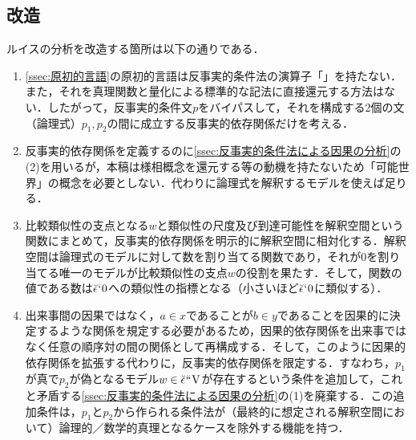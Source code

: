 \subsection{改造}
\label{ssec:改造}

ルイスの分析を改造する箇所は以下の通りである．

\begin{enumerate}
    \item \ref{ssec:原初的言語}の原初的言語は反事実的条件法の演算子「」を持たない．また，それを真理関数と量化による標準的な記法に直接還元する方法はない．したがって，反事実的条件文$p$をバイパスして，それを構成する2個の文（論理式）$p_1,p_2$の間に成立する反事実的依存関係だけを考える．
    \item 反事実的依存関係を定義するのに\ref{ssec:反事実的条件法による因果の分析}の(2)を用いるが，本稿は様相概念を還元する等の動機を持たないため「可能世界」の概念を必要としない．代わりに論理式を解釈するモデルを使えば足りる．
    \item 比較類似性の支点となる$w$と類似性の尺度及び到達可能性を解釈空間という関数にまとめて，反事実的依存関係を明示的に解釈空間に相対化する．解釈空間は論理式のモデルに対して数を割り当てる関数であり，それが$0$を割り当てる唯一のモデルが比較類似性の支点$w$の役割を果たす．そして，関数の値である数は$\breve{\epsilon}{\mspace{1mu}{`}\mspace{1mu}} 0$への類似性の指標となる（小さいほど$\breve{\epsilon}{\mspace{1mu}{`}\mspace{1mu}} 0$に類似する）．
    \item 出来事間の因果ではなく，$a\in x$であることが$b\in y$であることを因果的に決定するような関係を規定する必要があるため，因果的依存関係を出来事ではなく任意の順序対の間の関係として再構成する．そして，このように因果的依存関係を拡張する代わりに，反事実的依存関係を限定する．すなわち，$p_1$が真で$p_2$が偽となるモデル$w\in\breve{\epsilon}{\mspace{1mu}{``}\mspace{1mu}}\mathrm{V}$が存在するという条件を追加して，これと矛盾する\ref{ssec:反事実的条件法による因果の分析}の(1)を廃棄する．この追加条件は，$p_1$と$p_2$から作られる条件法が（最終的に想定される解釈空間において）論理的／数学的真理となるケースを除外する機能を持つ．
\end{enumerate}

